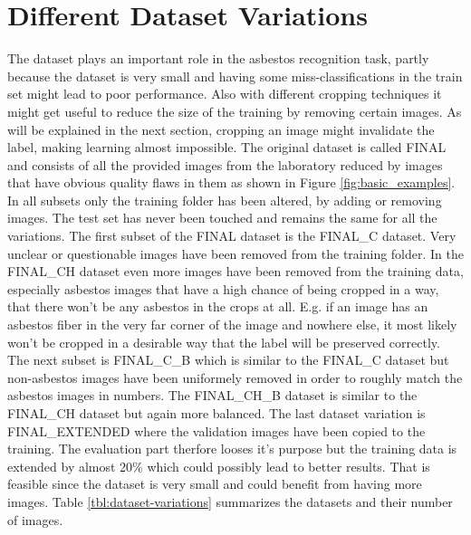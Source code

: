 \section{Different Dataset Variations}

The dataset plays an important role in the asbestos recognition task, partly because the dataset is very small and having some miss-classifications in the train set might lead to poor performance. Also with different cropping techniques it might get useful to reduce the size of the training by removing certain images. As will be explained in the next section, cropping an image might invalidate the label, making learning almost impossible. The original dataset is called FINAL and consists of all the provided images from the laboratory reduced by images that have obvious quality flaws in them as shown in Figure  \ref{fig:basic_examples}. In all subsets only the training folder has been altered, by adding or removing images. The test set has never been touched and remains the same for all the variations. The first subset of the FINAL dataset is the FINAL\_C dataset. Very unclear or questionable images have been removed from the training folder. In the FINAL\_CH dataset even more images have been removed from the training data, especially asbestos images that have a high chance of being cropped in a way, that there won't be any asbestos in the crops at all. E.g. if an image has an asbestos fiber in the very far corner of the image and nowhere else, it most likely won't be cropped in a desirable way that the label will be preserved correctly. The next subset is FINAL\_C\_B which is similar to the FINAL\_C dataset but non-asbestos images have been uniformely removed in order to roughly match the asbestos images in numbers. The FINAL\_CH\_B dataset is similar to the FINAL\_CH dataset but again more balanced. The last dataset variation is FINAL\_EXTENDED where the validation images have been copied to the training. The evaluation part therfore looses it's purpose but the training data is extended by almost 20\% which could possibly lead to better results. That is feasible since the dataset is very small and could benefit from having more images. Table \ref{tbl:dataset-variations} summarizes the datasets and their number of images.

